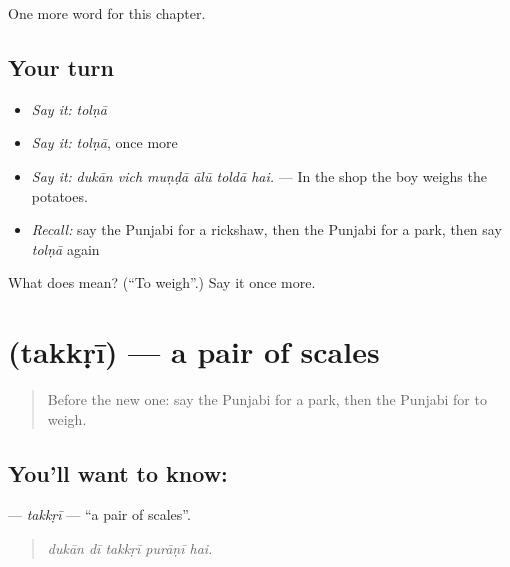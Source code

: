 \begin{grammarlens}[title={What you've built}]
One more word for this chapter.
\end{grammarlens}

\subsection*{Your turn}
\begin{itemize}
\raggedright
  \item \emph{Say it:} \emph{tolṇā}
  \item \emph{Say it:} \emph{tolṇā}, once more
  \item \emph{Say it:} \emph{dukān vich muṇḍā ālū toldā hai.} — In the shop the boy weighs the potatoes.
  \item \emph{Recall:} say the Punjabi for a rickshaw, then the Punjabi for a park, then say \emph{tolṇā} again
\end{itemize}

\begin{tcolorbox}[breakable,colback=teal!4,colframe=teal!35!black,title={Before you move on}]
What does  mean? (\textquotedblleft{}To weigh\textquotedblright{}.) Say it once more.
\end{tcolorbox}
\section[\texorpdfstring{\pa{ਤੱਕੜੀ} (takkṛī)}{ਤੱਕੜੀ (takkṛī)}]{ (takkṛī) — a pair of scales}

\label{lesson:PA-C273-takkri}



\begin{quote}
Before the new one: say the Punjabi for a park, then the Punjabi for to weigh.
\end{quote}

\subsection*{You'll want to know: }
\textbf{} — \emph{takkṛī} — \textquotedblleft{}a pair of scales\textquotedblright{}.

\begin{quote}
    
\end{quote}

\begin{quote}
\emph{dukān dī takkṛī purāṇī hai.}
\end{quote}

